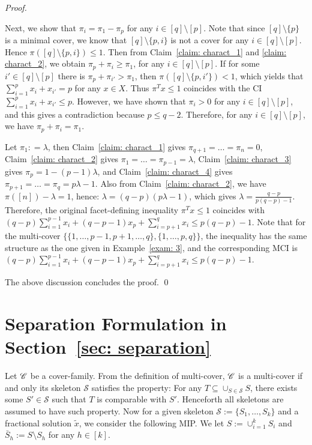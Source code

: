\begin{appendices}
\begin{proof}
\begin{enumerate}
\begin{cpf}
Next, we show that $\pi_i = \pi_1 - \pi_p$ for any $i  \in  [q] \setminus [p]$. 
Note that since $[q] \setminus \{p\}$ is a minimal cover, we know that $[q] \setminus \{p, i\}$ is not a cover for any $i \in [q] \setminus [p]$. 
Hence $\pi([q] \setminus \{p, i\}) \leq 1$. Then from Claim~\ref{claim: charact_1} and \ref{claim: charact_2}, we obtain $\pi_p + \pi_i \geq \pi_1$, for any $i \in [q] \setminus [p]$.
If for some $i' \in [q] \setminus [p]$ there is $\pi_p + \pi_{i'} > \pi_1$, then $\pi([q] \setminus \{p, i'\}) < 1$, which yields that $\sum_{i=1}^p x_i + x_{i'} = p$ for any $x \in X$.
Thus $\pi^T x \leq 1$ coincides with the CI $\sum_{i=1}^p x_i + x_{i'} \leq p$. 
However, we have shown that $\pi_i > 0$ for any $i \in [q] \setminus [p]$, and this gives a contradiction because $p \leq q-2$. 
Therefore, for any $i \in [q] \setminus [p]$, we have $\pi_p + \pi_i  = \pi_1$.
\end{cpf}
Let $\pi_1: = \lambda$, then Claim~\ref{claim: charact_1} gives $\pi_{q+1} = \ldots = \pi_n = 0$, Claim~\ref{claim: charact_2} gives $\pi_1 = \ldots = \pi_{p-1} = \lambda$, Claim~\ref{claim: charact_3} gives $\pi_p = 1-(p-1)\lambda$, and Claim~\ref{claim: charact_4} gives $\pi_{p+1} = \ldots = \pi_q = p \lambda - 1$. 
Also from Claim~\ref{claim: charact_2}, we have $\pi([n]) - \lambda = 1$, hence: $\lambda = (q-p)(p \lambda - 1)$, which gives $\lambda = \frac{q-p}{p(q-p)-1}$. Therefore, the original facet-defining inequality $\pi^T x \leq 1$ coincides with $ (q-p) \sum_{i=1}^{p-1} x_i + (q-p-1)x_p + \sum_{i=p+1}^q x_i \leq p(q-p)-1$. 
Note that for the multi-cover $\{\{1, \ldots, p-1, p+1, \ldots, q\}, \{1,\ldots, p,q\}\}$, the inequality has the same structure as the one given in Example~\ref{exam: 3}, and the corresponding MCI is $ (q-p) \sum_{i=1}^{p-1} x_i + (q-p-1)x_p + \sum_{i=p+1}^q x_i \leq p(q-p)-1$.
\end{enumerate}
The above discussion concludes the proof. 
\qed \end{proof}



\section{Separation Formulation in Section~\ref{sec: separation}}
\label{subsec: additional_formulation_sep}



Let $\mathscr{C}$ be a cover-family.
From the definition of multi-cover, $\mathscr{C}$ is a multi-cover if and only its skeleton $\mathscr{S}$ satisfies the property: For any $ T \subseteq \cup_{S \in \mathscr S} S$, there exists some $S' \in \mathscr S$ such that $T$ is comparable with $S'$.
Henceforth all skeletons are assumed to have such property.
Now for a given skeleton $\mathscr{S} := \{S_1, \ldots, S_k\}$ and a fractional solution $\tilde x$, we consider the following MIP. 
We let $S := \cup_{i=1}^k S_i$ and $\bar S_h := S \setminus S_h$ for any $h \in [k]$. 


\end{appendices}
